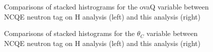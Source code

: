 \begin{figure}[!htbp]
    \centering
    
    \caption{Comparisons of stacked histrograms for the ovaQ variable between NCQE neutron tag on H analysis (left) and this analysis (right)} \label{fig:ovaq_reduction} 
    
     \hfill 
     \par
    
        
\end{figure}

\begin{figure}[!htbp]
    \centering
    
    \caption{Comparisons of stacked histograms for the $\theta_C$ variable between NCQE neutron tag on H analysis (left) and this analysis (right)} \label{fig:angle_reduction} 
    
     \hfill 
     \par
    
        
\end{figure}




